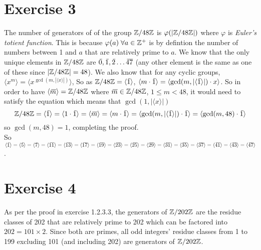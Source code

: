 \documentclass[12pt]{article}
\begin{document}
    \section*{Exercise 3}
    The number of generators of of the group $\mathbb{Z}/48\mathbb{Z}$
    is $\varphi(|\mathbb{Z}/48\mathbb{Z}|)$ where $\varphi$
    is \textit{Euler's totient function}.
    This is because $\varphi(a) \; \forall a \in \mathbb{Z}^+$
    is by defintion the number of numbers between 1 and $a$
    that are relatively prime to $a$.
    We know that the only unique elements in $\mathbb{Z}/48\mathbb{Z}$
    are $\,\overline{\!{0}}, \,\overline{\!{1}}, \,\overline{\!{2}} \dots \,\overline{\!{47}}$
    (any other element is the same as one of these since $|\mathbb{Z}/48\mathbb{Z}| = 48$).
    We also know that for any cyclic groups,
    $\langle x^m \rangle = \langle x^{\gcd(m, |\langle x \rangle|)} \rangle$,
    So as $\mathbb{Z}/48\mathbb{Z} = \langle \,\overline{\!{1}} \rangle$,
    $\langle m \cdot \,\overline{\!{1}} \rangle
    = \langle \gcd(m, |\langle \,\overline{\!{1}} \rangle|) \cdot x \rangle$.
    So in order to have $\langle \,\overline{\!{m}} \rangle = \mathbb{Z}/48\mathbb{Z}$
    where $\,\overline{\!{m}} \in \mathbb{Z}/48\mathbb{Z}$, $1 \leqslant m < 48$,
    it would need to satisfy the equation
    which means that $\gcd(1, |\langle x \rangle|)$
    \[ \mathbb{Z}/48\mathbb{Z} = \langle \,\overline{\!{1}} \rangle
    =  \langle 1 \cdot \,\overline{\!{1}} \rangle
    =  \langle \,\overline{\!{m}} \rangle
    =  \langle m \cdot \,\overline{\!{1}} \rangle
    =  \langle \gcd(m, |\langle \,\overline{\!{1}} \rangle|) \cdot \,\overline{\!{1}} \rangle
    =  \langle \gcd(m, 48) \cdot \,\overline{\!{1}} \rangle \]
    so $\gcd(m, 48) = 1$,
    completing the proof. \\
    So $\langle \olsi{1} \rangle
    = \langle \olsi{5} \rangle = \langle \olsi{7} \rangle
    = \langle \olsi{11} \rangle = \langle \olsi{13} \rangle
    = \langle \olsi{17} \rangle = \langle \olsi{19} \rangle
    = \langle \olsi{23} \rangle = \langle \olsi{25} \rangle
    = \langle \olsi{29} \rangle = \langle \olsi{31} \rangle
    = \langle \olsi{35} \rangle = \langle \olsi{37} \rangle
    = \langle \olsi{41} \rangle = \langle \olsi{43} \rangle
    = \langle \olsi{47} \rangle$.


    \section*{Exercise 4}
    As per the proof in exercise 1.2.3.3,
    the generators of $\mathbb{Z}/202\mathbb{Z}$ are the residue classes of 202
    that are relatively prime to 202
    which can be factored into $202 = 101 \times 2$.
    Since both are primes, all odd integers' residue classes
    from 1 to 199 excluding 101 (and including 202) are generators
    of $\mathbb{Z}/202\mathbb{Z}$.
\end{document}

